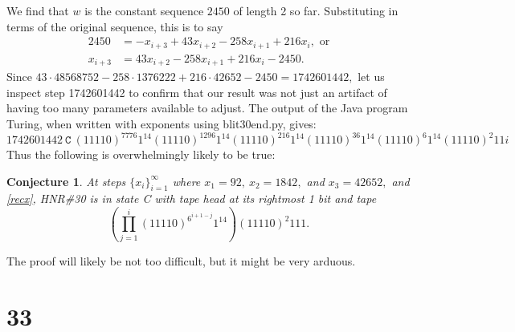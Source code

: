 \documentclass[12pt]{article}
\newtheorem*{conjecture}{Conjecture}
\begin{document}
We find that $w$ is the constant sequence $2450$ of length 2 so far.
Substituting in terms of the original sequence, this is to say
\begin{align}
2450&=-x_{i+3}+43x_{i+2}-258x_{i+1}+216x_i,\textrm{ or}\\
x_{i+3}&=43x_{i+2}-258x_{i+1}+216x_i-2450.\label{recx}
\end{align}
Since $43\cdot48568752-258\cdot1376222+216\cdot42652-2450=1742601442,$
let us inspect step 1742601442 to confirm that our result was not just an artifact of having
too many parameters available to adjust. The output of the Java program Turing,
when written with exponents using blit30end.py, gives:
$$1742601442~\texttt{C}~(11110)^{7776}1^{14}(11110)^{1296}1^{14}(11110)^{216}1^{14}(11110)^{36}1^{14}(11110)^{6}1^{14}(11110)^{2}11i$$
Thus the following is overwhelmingly likely to be true:
\begin{conjecture}
At steps $\{x_i\}_{i=1}^{\infty}$ where $x_1=92,~x_2=1842,$ and $x_3=42652,$ and \eqref{recx},
HNR\#30 is in state C with tape head at its rightmost 1 bit and tape
$$\left(\prod_{j=1}^i (11110)^{6^{i+1-j}}1^{14}\right)(11110)^2 111.$$
\end{conjecture}
The proof will likely be not too difficult, but it might be very arduous.

\clearpage
{}
{}
\section*{33}
\end{document}
